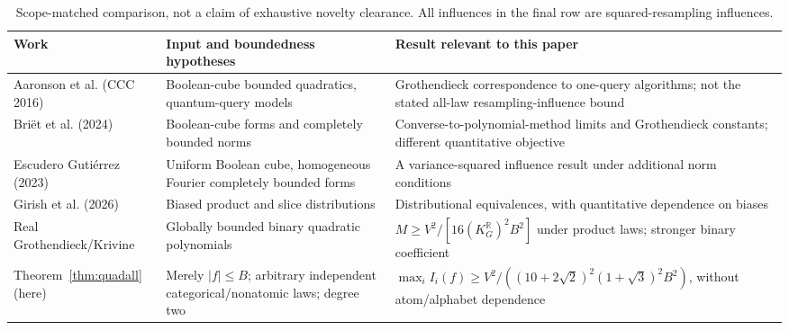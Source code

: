 \documentclass[11pt]{article}
\numberwithin{equation}{section}
\theoremstyle{remark}
\newcommand{\Kquad}{(10+2\sqrt2)^2(1+\sqrt3)^2}
\begin{document}
\begin{table}[ht]
\centering\footnotesize
\begin{tabular}{@{}>{\raggedright\arraybackslash}p{.235\linewidth}>{\raggedright\arraybackslash}p{.31\linewidth}>{\raggedright\arraybackslash}p{.355\linewidth}@{}}\toprule
Work & Input and boundedness hypotheses & Result relevant to this paper\\\midrule
Aaronson et al. (CCC 2016)~\cite{AAIKS16} & Boolean-cube bounded quadratics, quantum-query models & Grothendieck correspondence to one-query algorithms; not the stated all-law resampling-influence bound\\
Bri\"et et al. (2024)~\cite{BEG24} & Boolean-cube forms and completely bounded norms & Converse-to-polynomial-method limits and Grothendieck constants; different quantitative objective\\
Escudero Guti\'errez (2023)~\cite{EG23} & Uniform Boolean cube, homogeneous Fourier completely bounded forms & A variance-squared influence result under additional norm conditions\\
Girish et al. (2026)~\cite{GMNR26} & Biased product and slice distributions & Distributional equivalences, with quantitative dependence on biases\\
Real Grothendieck/Krivine~\cite{Pisier12} & Globally bounded binary quadratic polynomials & $M\ge V^2/[16(K_G^{\mathbb R})^2B^2]$ under product laws; stronger binary coefficient\\
Theorem~\ref{thm:quadall} (here) & Merely $|f|\le B$; arbitrary independent categorical/nonatomic laws; degree two & $\max_i I_i(f)\ge V^2/(\Kquad B^2)$, without atom/alphabet dependence\\\bottomrule
\end{tabular}
\caption{Scope-matched comparison, not a claim of exhaustive novelty clearance. All influences in the final row are squared-resampling influences.}\label{tab:quadratic-prior}
\end{table}
\end{document}

